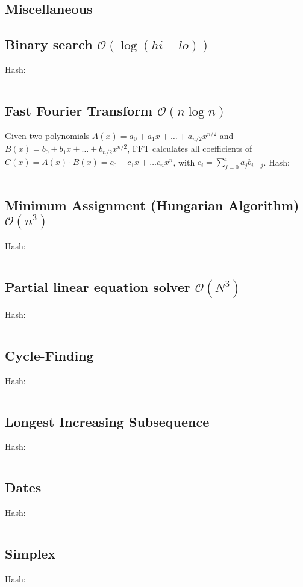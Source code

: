 \documentclass[9pt,a4paper,landscape,oneside]{amsart}
\newcommand{\mintedstyle}[2]{\inputminted{#1}{code/#2}}
\newcommand{\code}[1]{ Hash: 
\mintedstyle{cpp}{#1}}
\begin{document}
\begin{multicols*}{3}
\section{Miscellaneous}
\subsection{Binary search $\mathcal{O}(\log (hi - lo))$}
\code{binary_search.cpp}

\subsection{Fast Fourier Transform $\mathcal{O}(n \log n)$}
Given two polynomials $A(x) = a_0 + a_1 x + \dots + a_{n/2} x^{n/2}$ and $B(x) = b_0 + b_1 x + \dots + b_{n/2} x^{n/2}$, FFT calculates all coefficients of $C(x) = A(x) \cdot B(x) = c_0 + c_1 x + \dots c_{n} x^{n}$, with $c_i = \sum_{j=0}^{i} a_j b_{i-j}$.
\code{math/fft.cpp}

\subsection{Minimum Assignment (Hungarian Algorithm) $\mathcal{O}(n^{3})$}
\code{minimum_assignment.cpp}

\subsection{Partial linear equation solver $\mathcal{O}(N^3)$}
\code{matrix_solver.cpp}

\subsection{Cycle-Finding}
\code{other/floyds_algorithm.cpp}

\subsection{Longest Increasing Subsequence}
\code{other/lis.cpp}

\subsection{Dates}
\code{other/dates.cpp}

\subsection{Simplex}
\code{other/simplex.cpp}



\end{multicols*}
\end{document}
